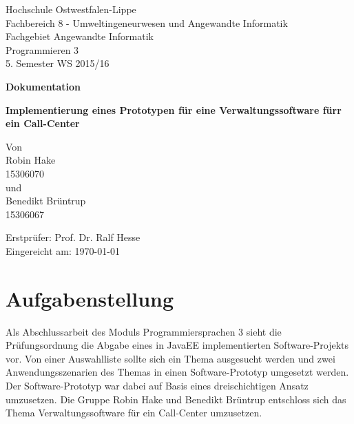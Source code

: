 \documentclass[12pt, a4paper]{article}
\begin{document}
\begin{titlepage}
Hochschule Ostwestfalen-Lippe \\
Fachbereich 8 - Umweltingeneurwesen und Angewandte Informatik \\
Fachgebiet Angewandte Informatik \\
Programmieren 3 \\
5. Semester WS 2015/16\\
\vspace{2cm}

\begin{center}
\begin{Large}
\textbf{Dokumentation} \\
\end{Large}
\vspace{2cm}

\begin{Large}
\textbf {Implementierung eines Prototypen für eine Verwaltungssoftware fürr ein Call-Center} \\[0.35cm]
\end{Large}
Von \\[0.35cm]
Robin Hake \\
15306070 \\[0.35cm]
und\\[0.35cm]
Benedikt Brüntrup \\
15306067 \\[0.35cm]
\end{center}

\vfill
Erstprüfer: Prof. Dr. Ralf Hesse \\
Eingereicht am: {\today}
\end{titlepage}

\newpage
\tableofcontents


\vfill
\newpage


\section{Aufgabenstellung}
Als Abschlussarbeit des Moduls \glqq Programmiersprachen 3\grqq{} sieht die Prüfungsordnung die Abgabe eines in JavaEE implementierten Software-Projekts vor. Von einer Auswahlliste sollte sich ein Thema ausgesucht werden und zwei Anwendungsszenarien des Themas in einen Software-Prototyp umgesetzt werden. Der Software-Prototyp war dabei auf Basis eines dreischichtigen Ansatz umzusetzen.  Die Gruppe Robin Hake und Benedikt Brüntrup entschloss sich das Thema \glqq Verwaltungssoftware für ein Call-Center\grqq{} umzusetzen.
\end{document}
